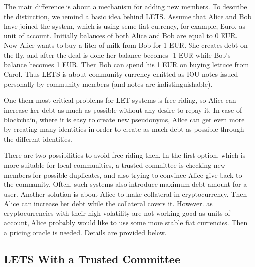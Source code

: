 \documentclass[]{llncs}   %
\begin{document}
The main difference is about a mechanism for adding new members. To describe the distinction, we remind a basic idea behind LETS. Assume that Alice and Bob have joined the system, which is using some fiat currency, for example, Euro, as unit of account. Initially
balances of both Alice and Bob are equal to 0 EUR. Now Alice wants to buy a liter of milk from Bob for 1 EUR. She creates debt on the fly, and after the deal is done her balance becomes -1 EUR while Bob's balance becomes 1 EUR. Then Bob can spend his 1 EUR on buying lettuce from Carol. Thus LETS is about community currency emitted as IOU notes issued personally by community members (and notes are indistinguishable).

One them most critical problems for LET systems is free-riding, so Alice can increase her debt as much as possible without any desire to repay it. In case of blockchain, where it is easy to create new pseudonyms, Alice can get even more by creating many identities in order to create as much debt as possible through the different identities.

There are two possibilities to avoid free-riding then. In the first option, which is more suitable for local communities, a trusted committee is checking new members for possible duplicates, and also trying to convince Alice give back to the community. Often, such systems also introduce maximum debt amount for a user. Another solution is about Alice to make collateral in cryptocurrency. Then Alice
can increase her debt while the collateral covers it. However. as cryptocurrencies with their high volatility are not working good as units of account, Alice probably would like to use some more stable fiat currencies. Then a pricing oracle is needed. Details are provided below.

\subsection{LETS With a Trusted Committee}
\label{sec-trusted}
\end{document}
